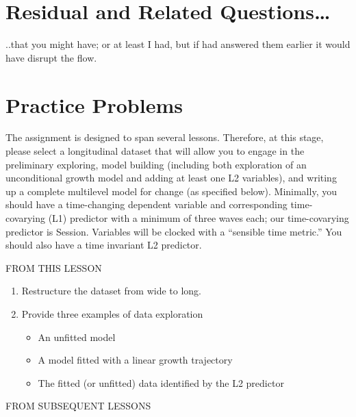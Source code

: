 \documentclass[
  english,
]{book}
\providecommand{\tightlist}{%
  \setlength{\itemsep}{0pt}\setlength{\parskip}{0pt}}
\begin{document}
\hypertarget{residual-and-related-questions-1}{%
\section{Residual and Related Questions\ldots{}}\label{residual-and-related-questions-1}}

..that you might have; or at least I had, but if had answered them earlier it would have disrupt the flow.

\hypertarget{practice-problems-1}{%
\section{Practice Problems}\label{practice-problems-1}}

The assignment is designed to span several lessons. Therefore, at this stage, please select a longitudinal dataset that will allow you to engage in the preliminary exploring, model building (including both exploration of an unconditional growth model and adding at least one L2 variables), and writing up a complete multilevel model for change (as specified below). Minimally, you should have a time-changing dependent variable and corresponding time-covarying (L1) predictor with a minimum of three waves each; our time-covarying predictor is Session. Variables will be clocked with a ``sensible time metric.'' You should also have a time invariant L2 predictor.

FROM THIS LESSON

\begin{enumerate}
\def\labelenumi{\arabic{enumi}.}
\tightlist
\item
  Restructure the dataset from wide to long.
\item
  Provide three examples of data exploration

  \begin{itemize}
  \tightlist
  \item
    An unfitted model
  \item
    A model fitted with a linear growth trajectory
  \item
    The fitted (or unfitted) data identified by the L2 predictor
  \end{itemize}
\end{enumerate}

FROM SUBSEQUENT LESSONS
\end{document}

